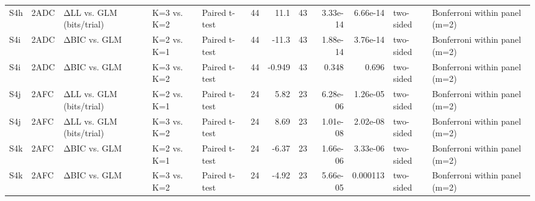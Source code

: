\begin{tabular}{lllllrrrrrll}
S4h & 2ADC & ΔLL vs. GLM (bits/trial) & K=3 vs. K=2 & Paired t-test & 44 & 11.1 & 43 & 3.33e-14 & 6.66e-14 & two-sided & Bonferroni within panel (m=2) \\
S4i & 2ADC & ΔBIC vs. GLM & K=2 vs. K=1 & Paired t-test & 44 & -11.3 & 43 & 1.88e-14 & 3.76e-14 & two-sided & Bonferroni within panel (m=2) \\
S4i & 2ADC & ΔBIC vs. GLM & K=3 vs. K=2 & Paired t-test & 44 & -0.949 & 43 & 0.348 & 0.696 & two-sided & Bonferroni within panel (m=2) \\
S4j & 2AFC & ΔLL vs. GLM (bits/trial) & K=2 vs. K=1 & Paired t-test & 24 & 5.82 & 23 & 6.28e-06 & 1.26e-05 & two-sided & Bonferroni within panel (m=2) \\
S4j & 2AFC & ΔLL vs. GLM (bits/trial) & K=3 vs. K=2 & Paired t-test & 24 & 8.69 & 23 & 1.01e-08 & 2.02e-08 & two-sided & Bonferroni within panel (m=2) \\
S4k & 2AFC & ΔBIC vs. GLM & K=2 vs. K=1 & Paired t-test & 24 & -6.37 & 23 & 1.66e-06 & 3.33e-06 & two-sided & Bonferroni within panel (m=2) \\
S4k & 2AFC & ΔBIC vs. GLM & K=3 vs. K=2 & Paired t-test & 24 & -4.92 & 23 & 5.66e-05 & 0.000113 & two-sided & Bonferroni within panel (m=2) \\
\bottomrule
\end{tabular}
